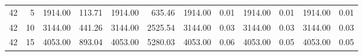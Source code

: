 \begin{table}
\begin{tabular}{@{}rrrrrrrrrrrr@{}}
42                                                                               & 5                                                                                     & 1914.00                                                                     & 113.71                                                                 & 1914.00                                                                     & 635.46                                                                  & 1914.00                                                                     & 0.01                                                                   & 1914.00                                                                     & 0.01                                                                   & 1914.00                                                                     & 0.01                                                                   \\
42                                                                               & 10                                                                                    & 3144.00                                                                     & 441.26                                                                 & 3144.00                                                                     & 2525.54                                                                 & 3144.00                                                                     & 0.03                                                                   & 3144.00                                                                     & 0.03                                                                   & 3144.00                                                                     & 0.03                                                                   \\
42                                                                               & 15                                                                                    & 4053.00                                                                     & 893.04                                                                 & 4053.00                                                                     & 5280.03                                                                 & 4053.00                                                                     & 0.06                                                                   & 4053.00                                                                     & 0.05                                                                   & 4053.00                                                                     & 0.05                                                                   \\

\end{tabular}
\end{table}
